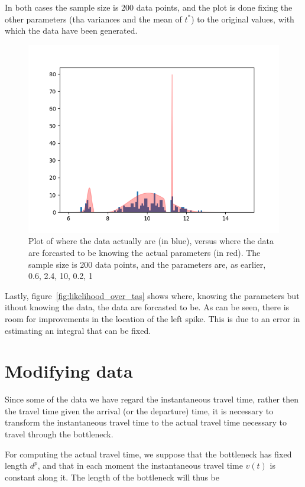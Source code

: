 \documentclass{article}
\begin{document}
In both cases the sample size is 200 data points, and the plot is done fixing the other parameters (tha variances and the mean of \(t^*\)) to the original values, with which the data have been generated.

\begin{figure}
  \centering
  \includegraphics[width=.8\textwidth]{img/likelihood_over_ta}
  \caption{Plot of where the data actually are (in blue), versus where the data are forcasted to be knowing the actual parameters (in red). The sample size is 200 data points, and the parameters are, as earlier, 0.6, 2.4, 10, 0.2, 1}
  \label{fig:likelihood_over_tas}
\end{figure}

Lastly, figure~\autoref{fig:likelihood_over_tas} shows where, knowing the parameters but ithout knowing the data, the data are forcasted to be.
As can be seen, there is room for improvements in the location of the left spike. This is due to an error in estimating an integral that can be fixed.

\section{Modifying data}

Since some of the data we have regard the instantaneous travel time,
rather then the travel time given the arrival (or the departure) time,
it is necessary to transform the instantaneous travel time to the actual travel time necessary to travel through the bottleneck.

For computing the actual travel time, we suppose that the bottleneck has fixed length \(d^p\),
and that in each moment the instantaneous travel time \(v(t)\) is constant along it.
The length of the bottleneck will thus be
\end{document}

